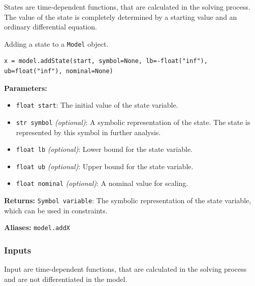 \documentclass[12pt]{article}
\begin{document}
States are time-dependent functions, that are calculated in the
solving process. The value of the state is completely determined by a starting
value and an ordinary differential equation.

\begin{mdframed}[backgroundcolor=gray!10, roundcorner=10pt, linewidth=1pt]

	Adding a state to a \texttt{Model} object.

	\begin{lstlisting}
x = model.addState(start, symbol=None, lb=-float("inf"), ub=float("inf"), nominal=None)
	\end{lstlisting}

	\textbf{Parameters:}
	\begin{itemize}
		\item \texttt{float start}: The initial value of the state
		      variable.
		\item \texttt{str symbol} \emph{(optional)}: A symbolic
		      representation of the state. The state is
		      represented by this symbol in
		      further analysis.
		\item \texttt{float lb} \emph{(optional)}: Lower bound for the
		      state variable.
		\item \texttt{float ub} \emph{(optional)}: Upper bound for the
		      state variable.
		\item \texttt{float nominal} \emph{(optional)}: A nominal value
		      for scaling.
	\end{itemize}

	\textbf{Returns:}
	\texttt{Symbol variable}: The symbolic representation of the state
	variable, which can be used in constraints.

	\textbf{Aliases:} \texttt{model.addX}
\end{mdframed}

\subsubsection{Inputs}

Input are time-dependent functions, that are calculated in the
solving process and are not differentiated in the model.
\end{document}
